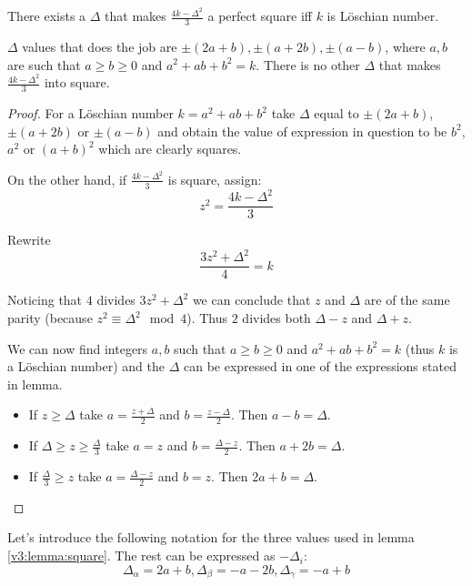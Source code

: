     \begin{lemma}
        \label{v3:lemma:square}
        There exists a $\Delta$ that makes $\frac{4k-\Delta^2}{3}$ a perfect square iff $k$ is Löschian number.
        
        $\Delta$ values that does the job are $\pm (2a+b), \pm (a+2b), \pm (a-b)$, where $a,b$ are such that $a \geq b \geq 0$ and $a^2+ab+b^2=k$. There is no other $\Delta$ that makes $\frac{4k-\Delta^2}{3}$ into square.
    \end{lemma}

    \begin{proof}
        For a Löschian number $k=a^2+ab+b^2$ take $\Delta$ equal to $\pm (2a+b)$, $\pm (a+2b)$ or $\pm (a-b)$ and obtain the value of expression in question to be $b^2$, $a^2$ or $(a+b)^2$ which are clearly squares.
        
        On the other hand, if $\frac{4k-\Delta^2}{3}$ is square, assign:
        \begin{equation}
            z^2 = \frac{4k-\Delta^2}{3}
        \end{equation}
        
        Rewrite
        \begin{equation}
            \frac{3z^2 + \Delta^2}{4} = k
        \end{equation}
        
        Noticing that $4$ divides $3z^2 + \Delta^2$ we can conclude that $z$ and $\Delta$ are of the same parity (because $z^2 \equiv \Delta^2 \mod 4$). Thus $2$ divides both $\Delta-z$ and $\Delta+z$.
        
        We can now find integers $a,b$ such that $a \geq b \geq 0$ and $a^2+ab+b^2=k$ (thus $k$ is a Löschian number) and the $\Delta$ can be expressed in one of the expressions stated in lemma.
        
        \begin{itemize}
            \item If $z \geq \Delta$ take $a=\frac{z+\Delta}{2}$ and $b=\frac{z-\Delta}{2}$. Then $a-b=\Delta$.
            \item If $\Delta \geq z \geq \frac \Delta 3$ take $a=z$ and $b=\frac{\Delta-z}{2}$. Then $a+2b=\Delta$.
            \item If $\frac \Delta 3 \geq z$ take $a=\frac{\Delta-z}{2}$ and $b=z$. Then $2a+b=\Delta$.
        \end{itemize}
    \end{proof}

    Let's introduce the following notation for the three values used in lemma \ref{v3:lemma:square}. The rest can be expressed as $-\Delta_i$:
    \begin{equation}
        \label{v3:eq:deltas}
        \Delta_\alpha = 2a+b, \Delta_\beta = -a-2b, \Delta_\gamma = -a+b
    \end{equation}

